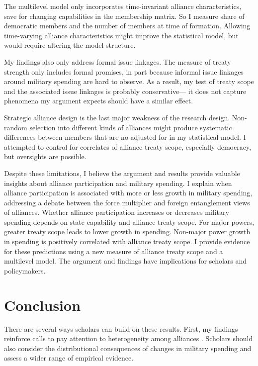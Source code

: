 \documentclass[12pt]{article}
\begin{document}
The multilevel model only incorporates time-invariant alliance characteristics, save for changing capabilities in the membership matrix. 
So I measure share of democratic members and the number of members at time of formation. 
Allowing time-varying alliance characteristics might improve the statistical model, but would require altering the model structure. 


My findings also only address formal issue linkages. 
The measure of treaty strength only includes formal promises, in part because informal issue linkages around military spending are hard to observe. 
As a result, my test of treaty scope and the associated issue linkages is probably conservative--- it does not capture phenomena my argument expects should have a similar effect. 


Strategic alliance design is the last major weakness of the research design. 
Non-random selection into different kinds of alliances might produce systematic differences between members that are no adjusted for in my statistical model. 
I attempted to control for correlates of alliance treaty scope, especially democracy, but oversights are possible. 


Despite these limitations, I believe the argument and results provide valuable insights about alliance participation and military spending. 
I explain when alliance participation is associated with more or less growth in military spending, addressing a debate between the force multiplier and foreign entanglement views of alliances. 
Whether alliance participation increases or decreases military spending depends on state capability and alliance treaty scope. 
For major powers, greater treaty scope leads to lower growth in spending. 
Non-major power growth in spending is positively correlated with alliance treaty scope. 
I provide evidence for these predictions using a new measure of alliance treaty scope and a multilevel model. 
The argument and findings have implications for scholars and policymakers. 



\section{Conclusion}


There are several ways scholars can build on these results. 
First, my findings reinforce calls to pay attention to heterogeneity among alliances \citep{Leeds2003, DigiuseppePoast2016}.
Scholars should also consider the distributional consequences of changes in military spending and assess a wider range of empirical evidence. 
\end{document}
